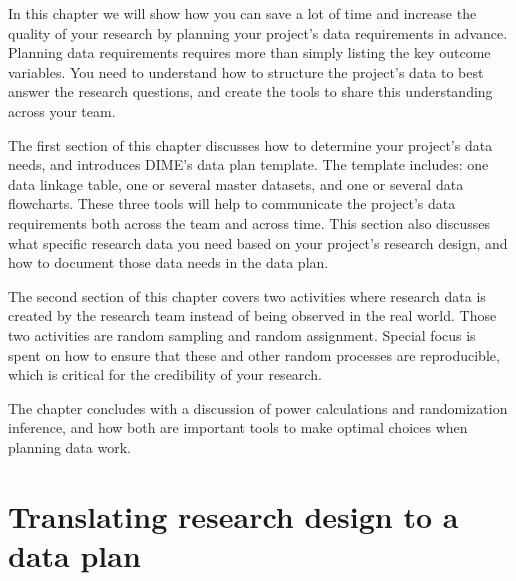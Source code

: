 
\begin{fullwidth}

In this chapter we will show how you can save a lot of time
and increase the quality of your research by
planning your project's data requirements in advance.
Planning data requirements requires more than
simply listing the key outcome variables.
You need to understand how to structure the project's data
to best answer the research questions,
and create the tools to share this understanding across your team.

The first section of this chapter discusses how to
determine your project's data needs,
and introduces DIME's data plan template.
The template includes:
one data linkage table,
one or several master datasets, and
one or several data flowcharts.
These three tools will help to communicate the project's data requirements
both across the team and across time.
This section also discusses what specific research data you need
based on your project's research design,
and how to document those data needs in the data plan.

The second section of this chapter covers two activities where
research data is created by the research team
instead of being observed in the real world.
Those two activities are random sampling and random assignment.
Special focus is spent on how to ensure that
these and other random processes are reproducible,
which is critical for the credibility of your research.

The chapter concludes with a discussion of power calculations and randomization inference,
and how both are important tools to make optimal choices when planning data work.


\end{fullwidth}


\section{Translating research design to a data plan}

